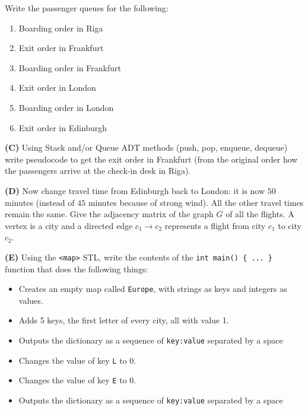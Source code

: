 \documentclass[a4paper,12pt]{article}
\begin{document}
Write the passenger queues for the following: 
\begin{enumerate}
\item Boarding order in Riga
\item Exit order in Frankfurt
\item Boarding order in Frankfurt
\item Exit order in London
\item Boarding order in London
\item Exit order in Edinburgh
\end{enumerate}

\vspace{5pt}
{\bf (C)} Using Stack and/or Queue ADT methods (push, pop, enqueue, dequeue)
write pseudocode to get the exit order in Frankfurt (from the original order how the
passengers arrive at the check-in desk in Riga).


\vspace{5pt}
{\bf (D)} Now change travel time from Edinburgh back to London: it is now $50$ minutes 
(instead of $45$ minutes because of strong wind). All the other travel times remain the same. 
Give the adjacency matrix of the graph $G$ of all the flights. 
A vertex is a city and a directed edge $c_1\to c_2$ 
represents a flight from city $c_1$ to city $c_2$.


\vspace{5pt}
{\bf (E)} Using the \texttt{<map>} STL, write the contents of the \texttt{int main() \{ ... \}} function that does the following things:
\begin{itemize}
\item Creates an empty map called \texttt{Europe}, with strings as keys and integers as values.
\item Adds 5 keys, the first letter of every city, all with value 1.
\item Outputs the dictionary as a sequence of \texttt{key:value} separated by a space
\item Changes the value of key \texttt{L} to 0. 
\item Changes the value of key \texttt{E} to 0. 
\item Outputs the dictionary as a sequence of \texttt{key:value} separated by a space
\end{itemize}
\end{document}
